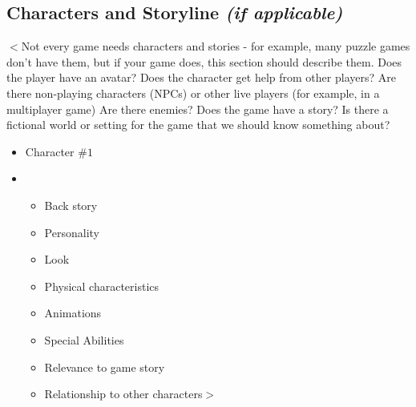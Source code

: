 \subsection{Characters and Storyline \textit{(if applicable)}}
$<$Not every game needs characters and stories - for example, many puzzle games don't have them, but if your game does, this section should describe them. Does the player have an avatar? Does the character get help from other players? Are there non-playing characters (NPCs) or other live players (for example, in a multiplayer game) Are there enemies? Does the game have a story? Is there a fictional world or setting for the game that we should know something about?

\begin{itemize}
    \item Character $\#1$
    \item \begin{itemize}
        \item Back story
        \item Personality
        \item Look
        \item Physical characteristics
        \item Animations
        \item Special Abilities
        \item Relevance to game story
        \item Relationship to other characters$>$
    \end{itemize}
\end{itemize}

